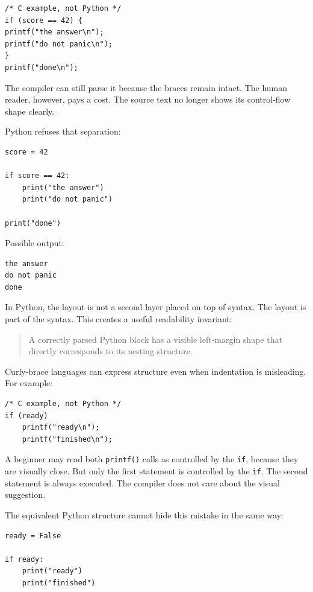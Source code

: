 \begin{verbatim}
/* C example, not Python */
if (score == 42) {
printf("the answer\n");
printf("do not panic\n");
}
printf("done\n");
\end{verbatim}

The compiler can still parse it because the braces remain intact. The human reader, however, pays a cost. The source text no longer shows its control-flow shape clearly.

Python refuses that separation:

\begin{verbatim}
score = 42

if score == 42:
    print("the answer")
    print("do not panic")

print("done")
\end{verbatim}

Possible output:

\begin{verbatim}
the answer
do not panic
done
\end{verbatim}

In Python, the layout is not a second layer placed on top of syntax. The layout is part of the syntax. This creates a useful readability invariant:

\begin{quote}
A correctly parsed Python block has a visible left-margin shape that directly corresponds to its nesting structure.
\end{quote}

Curly-brace languages can express structure even when indentation is misleading. For example:

\begin{verbatim}
/* C example, not Python */
if (ready)
    printf("ready\n");
    printf("finished\n");
\end{verbatim}

A beginner may read both \texttt{printf()} calls as controlled by the \texttt{if}, because they are visually close. But only the first statement is controlled by the \texttt{if}. The second statement is always executed. The compiler does not care about the visual suggestion.

The equivalent Python structure cannot hide this mistake in the same way:

\begin{verbatim}
ready = False

if ready:
    print("ready")
    print("finished")
\end{verbatim}

